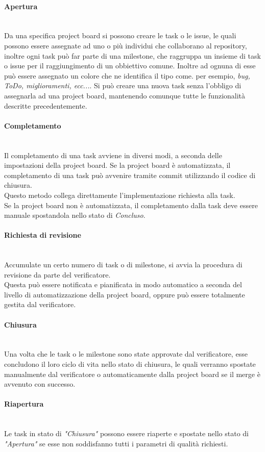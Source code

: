\paragraph{Apertura} \-\\
	Da una specifica project board si possono creare le task o le issue\glossario, le quali possono essere assegnate ad uno o più individui che collaborano al repository, inoltre ogni task può far parte di una milestone\glossario, che raggruppa un insieme di task o issue per il raggiungimento di un obbiettivo comune. 
	Inoltre ad ognuna di esse può essere assegnato un colore che ne identifica il tipo come. per esempio, \textit{bug, ToDo, miglioramenti, ecc...}. 
	Si può creare una nuova task senza l'obbligo di assegnarla ad una project board, mantenendo comunque tutte le funzionalità descritte precedentemente. 

\paragraph{Completamento} \-\\\label{ProcessiSupporto_GestioneProgetto_CicloTask_Completamento}
	Il completamento di una task avviene in diversi modi, a seconda delle impostazioni della project board. 
	Se la project board è automatizzata, il completamento di una task può avvenire tramite commit utilizzando il codice di chiusura. \\
	Questo metodo collega direttamente l'implementazione richiesta alla task. \\
	Se la project board non è automatizzata, il completamento dalla task deve essere manuale spostandola nello stato di \textit{Concluso}. 
	
\paragraph{Richiesta di revisione} \-\\
	Accumulate un certo numero di task o di milestone, si avvia la procedura di revisione da parte del verificatore. \\ Questa può essere notificata e pianificata in modo automatico a seconda del livello di automatizzazione della project board, oppure può essere totalmente gestita dal verificatore. 
	
	
	\paragraph{Chiusura} \-\\
	Una volta che le task o le milestone sono state approvate dal verificatore, esse concludono il loro ciclo di vita nello stato di chiusura, le quali verranno spostate manualmente dal verificatore o automaticamente dalla project board se il merge è avvenuto con successo. 
	
\paragraph{Riapertura} \-\\
	Le task in stato di \textit{"Chiusura"} possono essere riaperte e spostate nello stato di \textit{"Apertura"} se esse non soddisfanno tutti i parametri di qualità richiesti.
	
